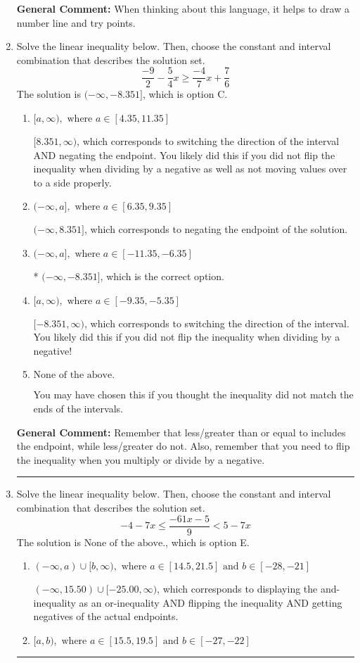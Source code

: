 \documentclass{extbook}[14pt]
\newcommand{\litem}[1]{\item #1

\rule{\textwidth}{0.4pt}}
\begin{document}
\begin{enumerate}
{\textbf{General Comment:} When thinking about this language, it helps to draw a number line and try points.
}
\litem{
Solve the linear inequality below. Then, choose the constant and interval combination that describes the solution set.
\[ \frac{-9}{2} - \frac{5}{4} x \geq \frac{-4}{7} x + \frac{7}{6} \]The solution is \( (-\infty, -8.351] \), which is option C.\begin{enumerate}[label=\Alph*.]
\item \( [a, \infty), \text{ where } a \in [4.35, 11.35] \)

 $[8.351, \infty)$, which corresponds to switching the direction of the interval AND negating the endpoint. You likely did this if you did not flip the inequality when dividing by a negative as well as not moving values over to a side properly.
\item \( (-\infty, a], \text{ where } a \in [6.35, 9.35] \)

 $(-\infty, 8.351]$, which corresponds to negating the endpoint of the solution.
\item \( (-\infty, a], \text{ where } a \in [-11.35, -6.35] \)

* $(-\infty, -8.351]$, which is the correct option.
\item \( [a, \infty), \text{ where } a \in [-9.35, -5.35] \)

 $[-8.351, \infty)$, which corresponds to switching the direction of the interval. You likely did this if you did not flip the inequality when dividing by a negative!
\item \( \text{None of the above}. \)

You may have chosen this if you thought the inequality did not match the ends of the intervals.
\end{enumerate}

\textbf{General Comment:} Remember that less/greater than or equal to includes the endpoint, while less/greater do not. Also, remember that you need to flip the inequality when you multiply or divide by a negative.
}
\litem{
Solve the linear inequality below. Then, choose the constant and interval combination that describes the solution set.
\[ -4 - 7 x \leq \frac{-61 x - 5}{9} < 5 - 7 x \]The solution is \( \text{None of the above.} \), which is option E.\begin{enumerate}[label=\Alph*.]
\item \( (-\infty, a) \cup [b, \infty), \text{ where } a \in [14.5, 21.5] \text{ and } b \in [-28, -21] \)

$(-\infty, 15.50) \cup [-25.00, \infty)$, which corresponds to displaying the and-inequality as an or-inequality AND flipping the inequality AND getting negatives of the actual endpoints.
\item \( [a, b), \text{ where } a \in [15.5, 19.5] \text{ and } b \in [-27, -22] \)


\end{enumerate}}
\end{enumerate}
\end{document}
